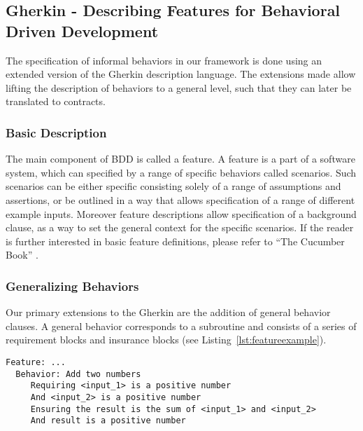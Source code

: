 \subsection{Gherkin - Describing Features for Behavioral Driven Development}
\label{sec:Gherkin - Describing Features for Behavioral Driven Development}

The specification of informal behaviors in our framework is done using an
extended version of the Gherkin description language.
The extensions made allow lifting the description of behaviors to a
general level, such that they can later be translated to contracts.

\subsubsection{Basic Description}
\label{sub:Basic Description}

The main component of BDD is called a feature.
A feature is a part of a software system,
which can specified by a range of specific behaviors called scenarios.
Such scenarios can be either specific consisting solely of a range of
assumptions and assertions, or be outlined in a way that allows
specification of a range of different example inputs.
Moreover feature descriptions allow specification of a background clause,
as a way to set the general context for the specific scenarios.
If the reader is further interested in basic feature definitions,
please refer to “The Cucumber Book” \cite{hellesoy2012}.

\subsubsection{Generalizing Behaviors}
\label{sub:Generalizing Behaviors}

Our primary extensions to the Gherkin are the addition of general
behavior clauses. A general behavior corresponds to a subroutine
and consists of a series of requirement blocks and insurance blocks
(see Listing~\ref{lst:featureexample}).

\begin{lstlisting}[caption={General Behavior Description of Adding Natural Numbers},label={lst:featureexample}]
  Feature: ...
  Behavior: Add two numbers
     Requiring <input_1> is a positive number
     And <input_2> is a positive number
     Ensuring the result is the sum of <input_1> and <input_2>
     And result is a positive number
\end{lstlisting}

